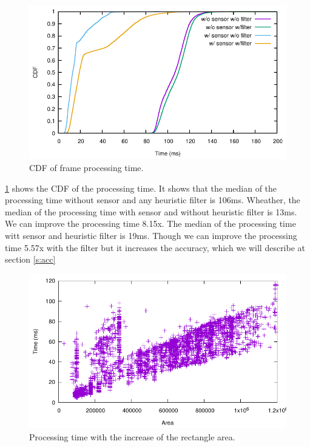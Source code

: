 \begin{figure}[h!]
\centering
\includegraphics[width=5.2in]{plots/walk_cdf_time.pdf}
\caption{CDF of frame processing time.}
\label{f:cdf_time}
\end{figure}


\ref{f:cdf_time} shows the CDF of the processing time.
It shows that the median of the processing time without sensor and any heuristic filter is 106ms.
Wheather, the median of the processing time with sensor and without heuristic filter is 13ms.
We can improve the processing time 8.15x.
The median of the processing time witt sensor and heuristic filter is 19ms.
Though we can improve the processing time 5.57x with the filter but it increases the accuracy, which we will describe at section \ref{s:acc}


\begin{figure}[h!]
\centering
\includegraphics[width=5.2in]{plots/sunny_recarea.pdf}
\caption{Processing time with the increase of the rectangle area.}
\label{f:recarea}
\end{figure}


